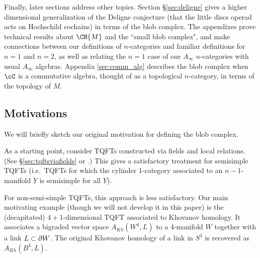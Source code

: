 Finally, later sections address other topics.
Section \S \ref{sec:deligne} gives
a higher dimensional generalization of the Deligne conjecture 
(that the little discs operad acts on Hochschild cochains) in terms of the blob complex.
The appendixes prove technical results about $\CH{M}$ and the ``small blob complex", 
and make connections between our definitions of $n$-categories and familiar definitions for $n=1$ and $n=2$, 
as well as relating the $n=1$ case of our $A_\infty$ $n$-categories with usual $A_\infty$ algebras. 
Appendix \ref{sec:comm_alg} describes the blob complex when $\cC$ is a commutative algebra, 
thought of as a topological $n$-category, in terms of the topology of $M$.





\subsection{Motivations}
\label{sec:motivations}

We will briefly sketch our original motivation for defining the blob complex.

As a starting point, consider TQFTs constructed via fields and local relations.
(See \S\ref{sec:tqftsviafields} or \cite{kw:tqft}.)
This gives a satisfactory treatment for semisimple TQFTs
(i.e.\ TQFTs for which the cylinder 1-category associated to an
$n{-}1$-manifold $Y$ is semisimple for all $Y$).

For non-semi-simple TQFTs, this approach is less satisfactory.
Our main motivating example (though we will not develop it in this paper)
is the (decapitated) $4{+}1$-dimensional TQFT associated to Khovanov homology.
It associates a bigraded vector space $A_{Kh}(W^4, L)$ to a 4-manifold $W$ together
with a link $L \subset \partial W$.
The original Khovanov homology of a link in $S^3$ is recovered as $A_{Kh}(B^4, L)$.

